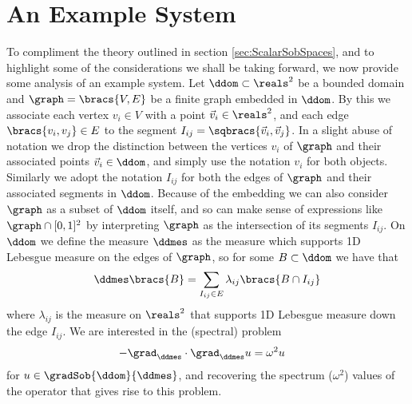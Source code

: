 \section{An Example System} \label{sec:ScalarExample}
To compliment the theory outlined in section \ref{sec:ScalarSobSpaces}, and to highlight some of the considerations we shall be taking forward, we now provide some analysis of an example system.
Let $\ddom\subset\reals^2$ be a bounded domain and $\graph = \bracs{V,E}$ be a finite graph embedded in $\ddom$.
By this we associate each vertex $v_i\in V$ with a point $\vec{v}_i\in\reals^2$, and each edge $\bracs{v_i,v_j}\in E$ to the segment $I_{ij}=\sqbracs{\vec{v}_i,\vec{v}_j}$.
In a slight abuse of notation we drop the distinction between the vertices $v_i$ of $\graph$ and their associated points $\vec{v}_i\in\ddom$, and simply use the notation $v_i$ for both objects.
Similarly we adopt the notation $I_{ij}$ for both the edges of $\graph$ and their associated segments in $\ddom$.
Because of the embedding we can also consider $\graph$ as a subset of $\ddom$ itself, and so can make sense of expressions like $\graph\cap[0,1]^2$ by interpreting $\graph$ as the intersection of its segments $I_{ij}$. 
On $\ddom$ we define the measure $\ddmes$ as the measure which supports 1D Lebesgue measure on the edges of $\graph$, so for some $B\subset\ddom$ we have that 
\begin{align*}
	\ddmes\bracs{B} = \sum_{I_{ij}\in E}\lambda_{ij}\bracs{B \cap I_{ij}}
\end{align*}
where $\lambda_{ij}$ is the measure on $\reals^2$ that supports 1D Lebesgue measure down the edge $I_{ij}$. 
We are interested in the (spectral) problem
\begin{align} \label{eq:ScalarExampleStrongForm}
	-\grad_\ddmes \cdot \grad_\ddmes u &= \omega^2 u
\end{align}
for $u\in\gradSob{\ddom}{\ddmes}$, and recovering the spectrum ($\omega^2$) values of the operator that gives rise to this problem.

